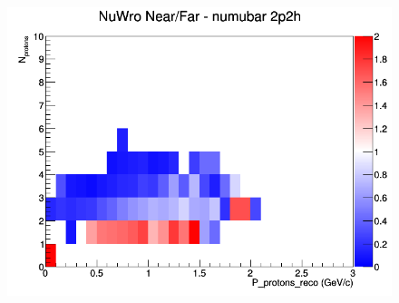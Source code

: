 \begin{figure}[h]
\endminipage
{}
\includegraphics[width=\linewidth]{eff_N_P/FGT/protons/ratios/2p2h_NuWro_numubar_NF_N_P.png}
\endminipage
\newline
\end{figure}
\clearpage
